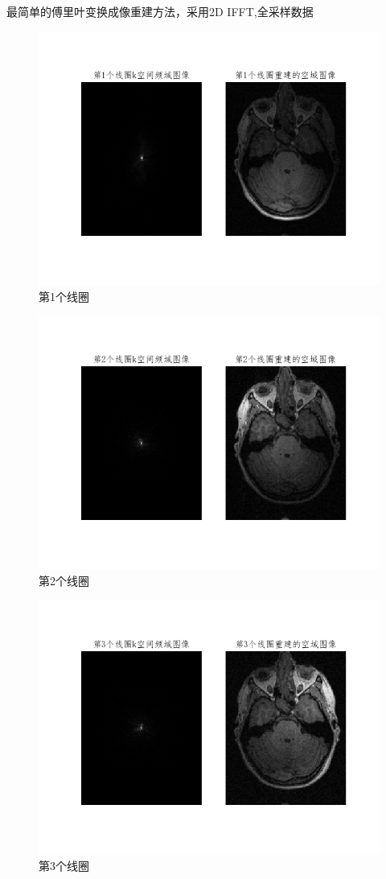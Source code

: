 

最简单的傅里叶变换成像重建方法，采用2D IFFT,全采样数据


\begin{figure}[H]
    \centering
    \includegraphics[width=0.6\linewidth]{fig/coil1.png}
    \caption{第1个线圈}
    \label{fig:coil1}
\end{figure}


\begin{figure}[H]
    \centering
    \includegraphics[width=0.6\linewidth]{fig/coil2.png}
    \caption{第2个线圈}
    \label{fig:coil2}
\end{figure}


\begin{figure}[H]
    \centering
    \includegraphics[width=0.6\linewidth]{fig/coil3.png}
    \caption{第3个线圈}
    \label{fig:coil3}
\end{figure}


